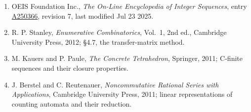 \documentclass[11pt]{article}
\theoremstyle{definition}
\begin{document}
\begin{enumerate}

\item OEIS Foundation Inc., \emph{The On-Line Encyclopedia of Integer Sequences}, entry \href{https://oeis.org/A250366}{A250366}, revision 7, last modified Jul 23 2025.

\item R. P. Stanley, \emph{Enumerative Combinatorics}, Vol.~1, 2nd ed., Cambridge University Press, 2012; \S4.7, the transfer-matrix method.

\item M. Kauers and P. Paule, \emph{The Concrete Tetrahedron}, Springer, 2011; C-finite sequences and their closure properties.

\item J. Berstel and C. Reutenauer, \emph{Noncommutative Rational Series with Applications}, Cambridge University Press, 2011; linear representations of counting automata and their reduction.

\end{enumerate}
\end{document}
